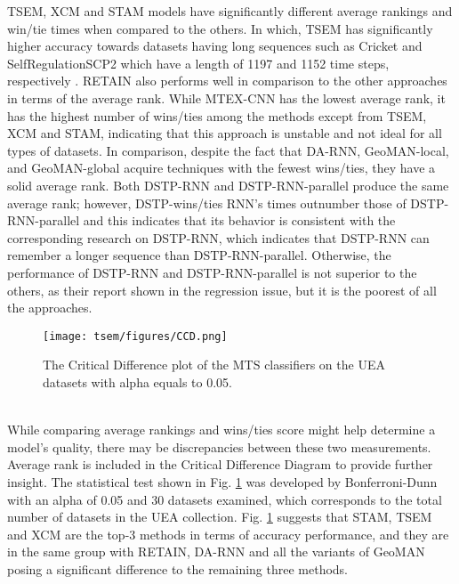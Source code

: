 \documentclass{svproc}
\begin{document}
TSEM, XCM and STAM models have significantly different average rankings and win/tie times when compared to the others. In which, TSEM has significantly higher accuracy towards datasets having long sequences such as Cricket and SelfRegulationSCP2 which have a length of 1197 and 1152 time steps, respectively \cite{bagnall2018uea}. RETAIN also performs well in comparison to the other approaches in terms of the average rank. While MTEX-CNN has the lowest average rank, it has the highest number of wins/ties among the methods except from TSEM, XCM and STAM, indicating that this approach is unstable and not ideal for all types of datasets. In comparison, despite the fact that DA-RNN, GeoMAN-local, and GeoMAN-global acquire techniques with the fewest wins/ties, they have a solid average rank. Both DSTP-RNN and DSTP-RNN-parallel produce the same average rank; however, DSTP-wins/ties RNN's times outnumber those of DSTP-RNN-parallel and this indicates that its behavior is consistent with the corresponding research on DSTP-RNN, which indicates that DSTP-RNN can remember a longer sequence than DSTP-RNN-parallel. Otherwise, the performance of DSTP-RNN and DSTP-RNN-parallel is not superior to the others, as their report shown in the regression issue, but it is the poorest of all the approaches. \\
\begin{figure}[h!]
\centering
\texttt{[image: tsem/figures/CCD.png]}
\caption{The Critical Difference plot of the MTS classifiers on the UEA datasets with alpha equals to
0.05.}
\label{fig:CCD}
\end{figure}
\\

While comparing average rankings and wins/ties score might help determine a model's quality, there may be discrepancies between these two measurements. Average rank is  included in the Critical  Difference Diagram to provide further insight. The statistical test shown in Fig. \ref{fig:CCD} was developed by Bonferroni-Dunn with an alpha of 0.05 and 30 datasets examined, which corresponds to the total number of datasets in the UEA collection. Fig. \ref{fig:CCD} suggests that STAM, TSEM and XCM are the top-3 methods in terms of accuracy performance, and they are in the same group with RETAIN, DA-RNN and all the variants of GeoMAN posing a significant difference to the remaining three methods. 
\end{document}
